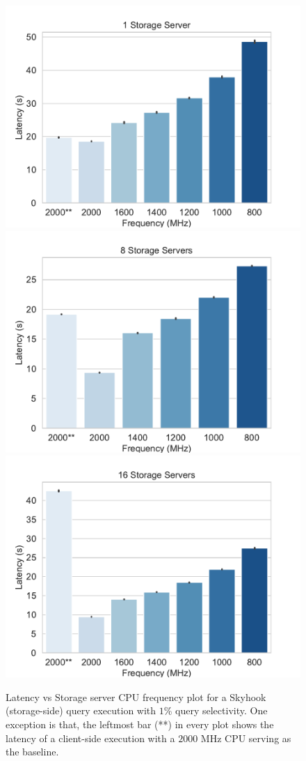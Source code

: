 \documentclass[12pt]{article}
\begin{document}
\begin{figure}[htp]

\centering
\includegraphics[width=.63\textwidth]{figs/plot_1.pdf}\hfill
\includegraphics[width=.63\textwidth]{figs/plot_8.pdf}\hfill
\includegraphics[width=.63\textwidth]{figs/plot_16.pdf}

\caption{Latency vs Storage server CPU frequency plot for a Skyhook (storage-side) query execution with $1$\% query selectivity. One exception is that, the leftmost bar (**) in every plot shows the latency of a client-side execution with a $2000$ MHz CPU serving as the baseline.}
\label{fig:cpu}

\end{figure}
\end{document}
